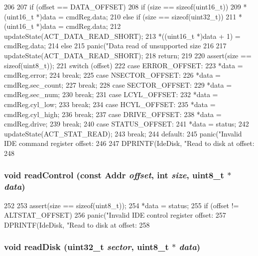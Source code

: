 \begin{DoxyCode}
206 {
207     if (offset == DATA_OFFSET) {
208         if (size == sizeof(uint16_t)) {
209             *(uint16_t *)data = cmdReg.data;
210         } else if (size == sizeof(uint32_t)) {
211             *(uint16_t *)data = cmdReg.data;
212             updateState(ACT_DATA_READ_SHORT);
213             *((uint16_t *)data + 1) = cmdReg.data;
214         } else {
215             panic("Data read of unsupported size %
216         }
217         updateState(ACT_DATA_READ_SHORT);
218         return;
219     }
220     assert(size == sizeof(uint8_t));
221     switch (offset) {
222       case ERROR_OFFSET:
223         *data = cmdReg.error;
224         break;
225       case NSECTOR_OFFSET:
226         *data = cmdReg.sec_count;
227         break;
228       case SECTOR_OFFSET:
229         *data = cmdReg.sec_num;
230         break;
231       case LCYL_OFFSET:
232         *data = cmdReg.cyl_low;
233         break;
234       case HCYL_OFFSET:
235         *data = cmdReg.cyl_high;
236         break;
237       case DRIVE_OFFSET:
238         *data = cmdReg.drive;
239         break;
240       case STATUS_OFFSET:
241         *data = status;
242         updateState(ACT_STAT_READ);
243         break;
244       default:
245         panic("Invalid IDE command register offset: %
246     }
247     DPRINTF(IdeDisk, "Read to disk at offset: %
248 }
\end{DoxyCode}
\hypertarget{classIdeDisk_a9eb9bf3059a1fb59a282c5b86ad10ce6}{
\subsubsection[{readControl}]{\setlength{\rightskip}{0pt plus 5cm}void readControl (const {\bf Addr} {\em offset}, \/  int {\em size}, \/  uint8\_\-t $\ast$ {\em data})}}
\label{classIdeDisk_a9eb9bf3059a1fb59a282c5b86ad10ce6}



\begin{DoxyCode}
252 {
253     assert(size == sizeof(uint8_t));
254     *data = status;
255     if (offset != ALTSTAT_OFFSET)
256         panic("Invalid IDE control register offset: %
257     DPRINTF(IdeDisk, "Read to disk at offset: %
258 }
\end{DoxyCode}
\hypertarget{classIdeDisk_a8df41040225176356e649c3d35e11c62}{
\subsubsection[{readDisk}]{\setlength{\rightskip}{0pt plus 5cm}void readDisk ({\bf uint32\_\-t} {\em sector}, \/  uint8\_\-t $\ast$ {\em data})}}
\label{classIdeDisk_a8df41040225176356e649c3d35e11c62}



